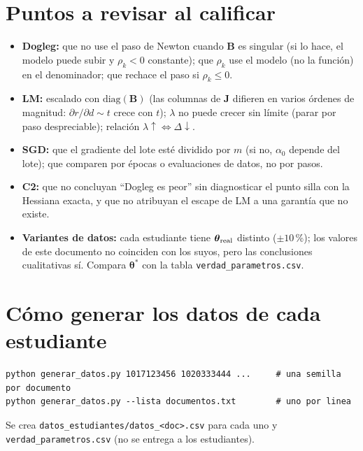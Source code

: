 \documentclass[11pt,letterpaper]{article}
\newcommand{\tht}{\boldsymbol{\theta}}
\begin{document}
\section{Puntos a revisar al calificar}
\begin{itemize}
\item \textbf{Dogleg:} que no use el paso de Newton cuando $\mathbf B$ es singular (si lo hace, el modelo puede
subir y $\rho_k<0$ constante); que $\rho_k$ use el modelo (no la funci\'on) en el denominador; que rechace el
paso si $\rho_k\le0$.
\item \textbf{LM:} escalado con $\mathrm{diag}(\mathbf B)$ (las columnas de $\mathbf J$ difieren en varios \'ordenes de
magnitud: $\partial r/\partial d\sim t$ crece con $t$); $\lambda$ no puede crecer sin l\'imite (parar por paso
despreciable); relaci\'on $\lambda\uparrow\Leftrightarrow\Delta\downarrow$.
\item \textbf{SGD:} que el gradiente del lote est\'e dividido por $m$ (si no, $\alpha_0$ depende del lote); que
comparen por \'epocas o evaluaciones de datos, no por pasos.
\item \textbf{C2:} que no concluyan ``Dogleg es peor'' sin diagnosticar el punto silla con la Hessiana exacta, y
que no atribuyan el escape de LM a una garant\'ia que no existe.
\item \textbf{Variantes de datos:} cada estudiante tiene $\tht_{\rm real}$ distinto ($\pm10$\,\%); los valores de
este documento no coinciden con los suyos, pero las conclusiones cualitativas s\'i. Compara $\tht^\ast$ con la
tabla \texttt{verdad\_parametros.csv}.
\end{itemize}

\section{C\'omo generar los datos de cada estudiante}
\begin{verbatim}
python generar_datos.py 1017123456 1020333444 ...     # una semilla por documento
python generar_datos.py --lista documentos.txt        # uno por linea
\end{verbatim}
Se crea \texttt{datos\_estudiantes/datos\_<doc>.csv} para cada uno y
\texttt{verdad\_parametros.csv} (no se entrega a los estudiantes).
\end{document}
